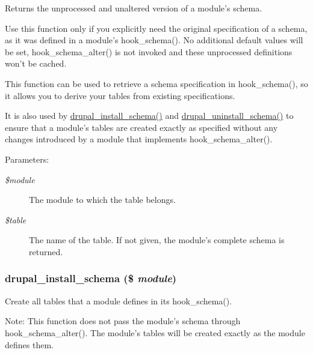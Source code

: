Returns the unprocessed and unaltered version of a module's schema.

Use this function only if you explicitly need the original specification of a schema, as it was defined in a module's hook\_\-schema(). No additional default values will be set, hook\_\-schema\_\-alter() is not invoked and these unprocessed definitions won't be cached.

This function can be used to retrieve a schema specification in hook\_\-schema(), so it allows you to derive your tables from existing specifications.

It is also used by \hyperlink{group__schemaapi_g9706b8d6ecdac10302d83bd50935a698}{drupal\_\-install\_\-schema()} and \hyperlink{group__schemaapi_g0688b6627af9dc05f2618f81489c3db0}{drupal\_\-uninstall\_\-schema()} to ensure that a module's tables are created exactly as specified without any changes introduced by a module that implements hook\_\-schema\_\-alter().

\begin{Desc}
\item[Parameters:]
\begin{description}
\item[{\em \$module}]The module to which the table belongs. \item[{\em \$table}]The name of the table. If not given, the module's complete schema is returned. \end{description}
\end{Desc}
\hypertarget{group__schemaapi_g9706b8d6ecdac10302d83bd50935a698}{
\subsubsection[{drupal\_\-install\_\-schema}]{\setlength{\rightskip}{0pt plus 5cm}drupal\_\-install\_\-schema (\$ {\em module})}}
\label{group__schemaapi_g9706b8d6ecdac10302d83bd50935a698}


Create all tables that a module defines in its hook\_\-schema().

Note: This function does not pass the module's schema through hook\_\-schema\_\-alter(). The module's tables will be created exactly as the module defines them.

